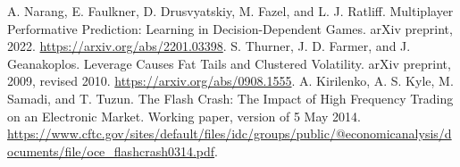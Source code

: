  A. Narang, E. Faulkner, D. Drusvyatskiy, M. Fazel, and L. J. Ratliff. Multiplayer Performative Prediction: Learning in Decision-Dependent Games. arXiv preprint, 2022. \url{https://arxiv.org/abs/2201.03398}.
 S. Thurner, J. D. Farmer, and J. Geanakoplos. Leverage Causes Fat Tails and Clustered Volatility. arXiv preprint, 2009, revised 2010. \url{https://arxiv.org/abs/0908.1555}.
 A. Kirilenko, A. S. Kyle, M. Samadi, and T. Tuzun. The Flash Crash: The Impact of High Frequency Trading on an Electronic Market. Working paper, version of 5 May 2014. \url{https://www.cftc.gov/sites/default/files/idc/groups/public/@economicanalysis/documents/file/oce_flashcrash0314.pdf}.

